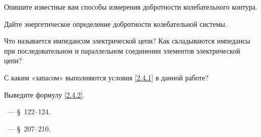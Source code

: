 \begin{lab:questions}
    \item Опишите известные вам способы измерения добротности колебательного контура.
    \item Дайте энергетическое определение добротности колебательной системы.
    \item Что называется импедансом электрической цепи?
        Как складываются импедансы при последовательном и параллельном
        соединении элементов электрической цепи?
    \item С каким «запасом» выполняются условия \eqref{2.4.1} в данной работе?
    \item Выведите формулу \eqref{2.4.2}.
\end{lab:questions}


\begin{lab:literature}
	\item \SivuhinIII~--- \S~122--124.

	\item \Kalashnikov~--- \S~207--210.
\end{lab:literature}
